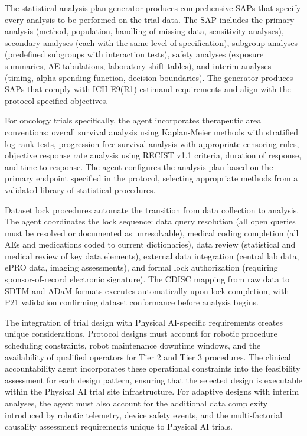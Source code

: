 The statistical analysis plan generator produces comprehensive SAPs that specify every
analysis to be performed on the trial data. The SAP includes the primary analysis (method,
population, handling of missing data, sensitivity analyses), secondary analyses (each with
the same level of specification), subgroup analyses (predefined subgroups with interaction
tests), safety analyses (exposure summaries, AE tabulations, laboratory shift tables), and
interim analyses (timing, alpha spending function, decision boundaries). The generator
produces SAPs that comply with ICH E9(R1) estimand requirements \cite{ich-e9r1} and
align with the protocol-specified objectives.

For oncology trials specifically, the agent incorporates therapeutic area conventions:
overall survival analysis using Kaplan-Meier methods with stratified log-rank tests,
progression-free survival analysis with appropriate censoring rules, objective response
rate analysis using RECIST v1.1 criteria, duration of response, and time to response.
The agent configures the analysis plan based on the primary endpoint specified in the
protocol, selecting appropriate methods from a validated library of statistical procedures.

Dataset lock procedures automate the transition from data collection to analysis. The agent
coordinates the lock sequence: data query resolution (all open queries must be resolved or
documented as unresolvable), medical coding completion (all AEs and medications coded to
current dictionaries), data review (statistical and medical review of key data elements),
external data integration (central lab data, ePRO data, imaging assessments), and formal
lock authorization (requiring sponsor-of-record electronic signature). The CDISC mapping
from raw data to SDTM and ADaM formats executes automatically upon lock completion, with
P21 validation confirming dataset conformance before analysis begins.

The integration of trial design with Physical AI-specific requirements creates unique
considerations. Protocol designs must account for robotic procedure scheduling constraints,
robot maintenance downtime windows, and the availability of qualified operators for Tier 2
and Tier 3 procedures. The clinical accountability agent incorporates these operational
constraints into the feasibility assessment for each design pattern, ensuring that the
selected design is executable within the Physical AI trial site infrastructure. For
adaptive designs with interim analyses, the agent must also account for the additional
data complexity introduced by robotic telemetry, device safety events, and the
multi-factorial causality assessment requirements unique to Physical AI trials.
